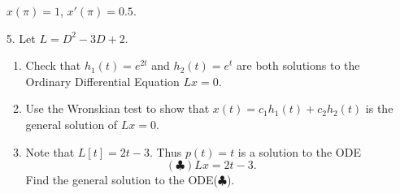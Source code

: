 \documentclass[12pt]{amsart}
\begin{document}
\begin{enumerate}[1.]
  \(x(\pi) = 1\), \(x'(\pi) = 0.5\).
\item[5.] Let \(L = D^2- 3D + 2\).
  \begin{enumerate}
  \item Check that \(h_1(t) = e^{2t}\) and \(h_2(t) = e^t\) are both solutions to the
    Ordinary Differential Equation \(Lx = 0\).
  \item Use the Wronskian test to show that \(x(t) = c_1h_1(t) +
    c_2h_2(t)\) is the general solution of \(Lx = 0\).
  \item Note that \(L[t] = 2t - 3\).
    Thus \(p(t) = t\) is a solution to the ODE
    \[(\clubsuit)    Lx = 2t - 3.\]Find the
    general solution to the ODE(\(\clubsuit\)).
  \end{enumerate}
\end{enumerate}
\end{document}
